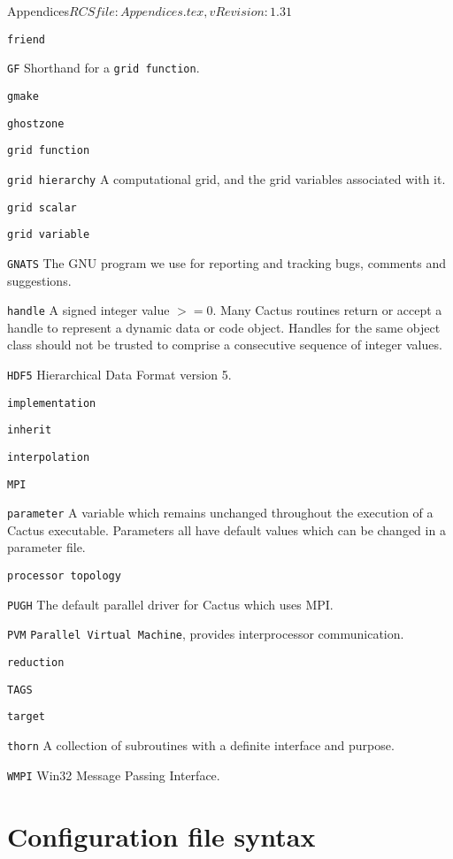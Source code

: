 \begin{cactuspart}{6}{Appendices}{$RCSfile: Appendices.tex,v $}{$Revision: 1.31 $}
\begin{Lentry}
\item[{\tt friend}]
\item[{\tt GF}] Shorthand for a {\tt grid function}.
\item[{\tt gmake}]
\item[{\tt ghostzone}]
\item[{\tt grid function}]
\item[{\tt grid hierarchy}] A computational grid, and the grid variables associated with it.
\item[{\tt grid scalar}]
\item[{\tt grid variable}]
\item[{\tt GNATS}] The GNU program we use for reporting and tracking bugs,
  comments and suggestions.
\item[{\tt handle}] A signed integer value $>= 0$. Many Cactus routines return
  or accept a handle to represent a dynamic data or code object. Handles for
  the same object class should not be trusted to comprise a consecutive
  sequence of integer values.
\item[{\tt HDF5}] Hierarchical Data Format version 5.
\item[{\tt implementation}]
\item[{\tt inherit}]
\item[{\tt interpolation}]
\item[{\tt MPI}]
\item[{\tt parameter}] A variable which remains unchanged throughout the execution of a Cactus executable. Parameters all have default values which can be changed in a parameter file.
\item[{\tt processor topology}]
\item[{\tt PUGH}] The default parallel driver for Cactus which uses MPI.
\item[{\tt PVM}]  {\tt Parallel Virtual Machine}, provides interprocessor
  communication.
\item[{\tt reduction}]
\item[{\tt TAGS}]
\item[{\tt target}]
\item[{\tt thorn}] A collection of subroutines with a definite interface
             and purpose.
\item[{\tt WMPI}] Win32 Message Passing Interface.

\end{Lentry}


\chapter{Configuration file syntax}
\label{sec:cofisy}


\end{cactuspart}
